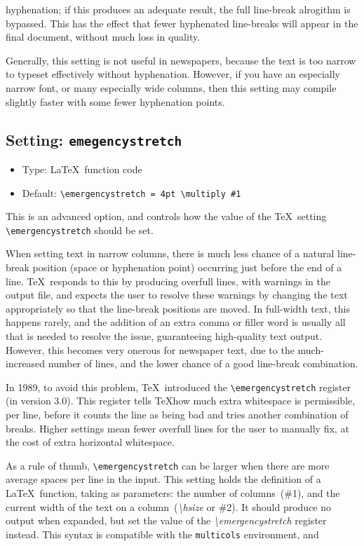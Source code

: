 \documentclass[a4paper,DIV=11]{scrartcl}
\newcommand{\property}[5]{
  \subsection{#1: \texttt{#2}}
  \begin{itemize}
  \item Type: #3
  \item Default: #4
  \end{itemize}
  #5
}
\newcommand{\setting}{\property{Setting}}
\begin{document}
\begin{multicols}{2}
{  hyphenation; if this produces an adequate result, the full
  line-break alrogithm is bypassed. This has the effect that fewer
  hyphenated line-breaks will appear in the final document, without
  much loss in quality.\par
  Generally, this setting is not useful in newspapers, because the
  text is too narrow to typeset effectively without
  hyphenation. However, if you have an especially narrow font, or many
  especially wide columns, then this setting may compile slightly
  faster with some fewer hyphenation points.
}
\setting{emegencystretch}{\LaTeX\ function code}{\texttt{\textbackslash emergencystretch = 4pt \textbackslash multiply \#1}}{
  This is an advanced option, and controls how the value of the \TeX\ setting
  \texttt{\textbackslash emergencystretch} should be set.\par
  When setting text in narrow columns, there is much less chance of a
  natural line-break position (space or hyphenation point) occurring
  just before the end of a line. \TeX\ responds to this by producing
  overfull lines, with warnings in the output file, and expects the
  user to resolve these warnings by changing the text appropriately so
  that the line-break positions are moved. In full-width text, this
  happens rarely, and the addition of an extra comma or filler word is
  usually all that is needed to resolve the issue, guaranteeing
  high-quality text output. However, this
  becomes very onerous for newspaper text, due to the much-increased
  number of lines, and the lower chance of a good line-break
  combination.\par
  In 1989, to avoid this problem, \TeX\ introduced the
  \texttt{\textbackslash emergencystretch}
  register (in version 3.0). This register tells \TeX how much extra
  whitespace is permissible, per line, before it counts the line as
  being bad and tries another combination of breaks. Higher settings
  mean fewer overfull lines for the user to manually fix, at the cost
  of extra horizontal whitespace.\par
  As a rule of thumb, \texttt{\textbackslash emergencystretch} can be
  larger when there are more average spaces per line in the input.
  This setting holds the definition of a \LaTeX\ function, taking as
  parameters: the number of columns~(\#1), and the current width of
  the text on a column~(\textit{\textbackslash hsize} or \#2). It
  should produce no output when expanded, but set the value of the
  \textit{\textbackslash emergencystretch} register instead. This
  syntax is compatible with the \texttt{multicols} environment, and
}
\end{multicols}
\end{document}
